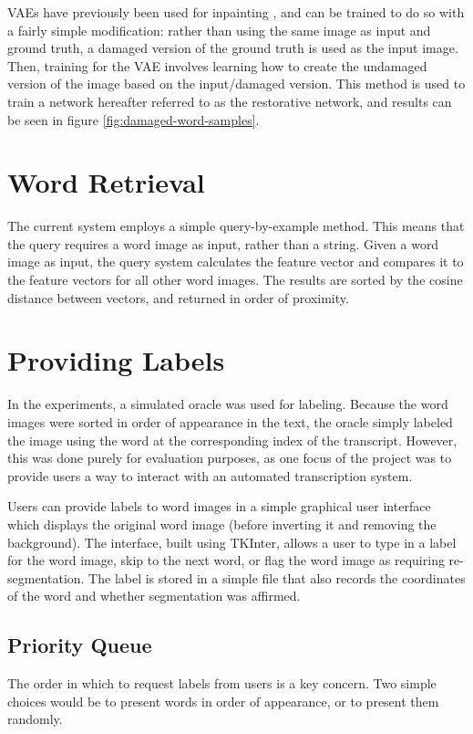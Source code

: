 \documentclass[final]{ukthesis}
\begin{document}
VAEs have previously been used for inpainting \cite{xie2012image}, and can be trained to do so with a fairly simple modification: rather than using the same image as input and ground truth, a damaged version of the ground truth is used as the input image. Then, training for the VAE involves learning how to create the undamaged version of the image based on the input/damaged version. This method is used to train a network hereafter referred to as the restorative network, and results can be seen in figure \ref{fig:damaged-word-samples}.


%
%
\section{Word Retrieval}
The current system employs a simple query-by-example method. This means that the query requires a word image as input, rather than a string. Given a word image as input, the query system calculates the feature vector and compares it to the feature vectors for all other word images. The results are sorted by the cosine distance between vectors, and returned in order of proximity.



%
%
\section{Providing Labels}
In the experiments, a simulated oracle was used for labeling. Because the word images were sorted in order of appearance in the text, the oracle simply labeled the image using the word at the corresponding index of the transcript. However, this was done purely for evaluation purposes, as one focus of the project was to provide users a way to interact with an automated transcription system.

Users can provide labels to word images in a simple graphical user interface which displays the original word image (before inverting it and removing the background). The interface, built using TKInter, allows a user to type in a label for the word image, skip to the next word, or flag the word image as requiring re-segmentation. The label is stored in a simple file that also records the coordinates of the word and whether segmentation was affirmed.

\subsection{Priority Queue}
The order in which to request labels from users is a key concern. Two simple choices would be to present words in order of appearance, or to present them randomly.
\end{document}
